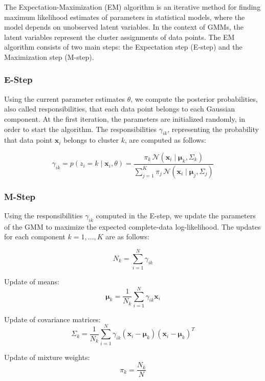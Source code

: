 The Expectation-Maximization (EM) algorithm \cite{dempster1977em} is an iterative method for finding maximum likelihood estimates of parameters in statistical models,
where the model depends on unobserved latent variables. In the context of GMMs, the latent variables represent the cluster assignments of data points.
The EM algorithm consists of two main steps: the Expectation step (E-step) and the Maximization step (M-step).

\subsubsection*{E-Step}

Using the current parameter estimates $\theta$, we compute the posterior probabilities, also called responsibilities, that each data point belongs to each Gaussian component.
At the first iteration, the parameters are initialized randomly, in order to start the algorithm.
The responsibilities $\gamma_{ik}$, representing the probability that data point $\boldsymbol{x}_i$ belongs to cluster $k$, are computed as follows:

\begin{equation}
\gamma_{ik} 
= p(z_i = k \mid \boldsymbol{x}_i, \theta)
= \frac{\pi_k \, \mathcal{N}(\boldsymbol{x}_i \mid \boldsymbol{\mu}_k, \Sigma_k)}
       {\sum_{j=1}^{K} \pi_j \, \mathcal{N}(\boldsymbol{x}_i \mid \boldsymbol{\mu}_j, \Sigma_j)}
    \label{e_step_equation}
\end{equation}
\subsubsection*{M-Step}
Using the responsibilities \(\gamma_{ik}\) computed in the E-step, we update the parameters of the GMM to maximize the expected complete-data log-likelihood.
The updates for each component \(k = 1, \dots, K\) are as follows:

\begin{equation}
N_k = \sum_{i=1}^{N} \gamma_{ik}
\label{m_step_equation}
\end{equation}

Update of means:
\[\boldsymbol{\mu}_k = \frac{1}{N_k} \sum_{i=1}^{N} \gamma_{ik} \boldsymbol{x}_i\]   

Update of covariance matrices:
\[\Sigma_k = \frac{1}{N_k} \sum_{i=1}^{N} \gamma_{ik} (\boldsymbol{x}_i - \boldsymbol{\mu}_k)(\boldsymbol{x}_i - \boldsymbol{\mu}_k)^T\]

Update of mixture weights:
\[\pi_k = \frac{N_k}{N}\]

